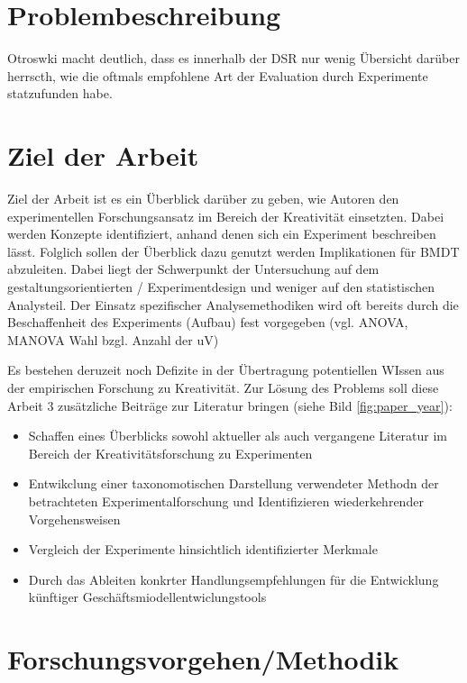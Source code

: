 \section{Problembeschreibung} \label{eqn:1}

Otroswki macht deutlich, dass es innerhalb der DSR nur wenig Übersicht darüber herrscth, wie die oftmals empfohlene Art der Evaluation durch Experimente statzufunden habe.

\section{Ziel der Arbeit}

Ziel der Arbeit ist es ein Überblick darüber zu geben, wie Autoren den experimentellen Forschungsansatz im Bereich der Kreativität einsetzten. Dabei werden Konzepte identifiziert, anhand denen sich ein Experiment beschreiben lässt. Folglich sollen der Überblick dazu genutzt werden Implikationen für BMDT abzuleiten.
Dabei liegt der Schwerpunkt der Untersuchung auf dem gestaltungsorientierten / Experimentdesign und weniger auf den statistischen Analysteil. Der Einsatz spezifischer Analysemethodiken wird oft bereits durch die Beschaffenheit des Experiments (Aufbau) fest vorgegeben (vgl. ANOVA, MANOVA Wahl bzgl. Anzahl der uV)


Es bestehen deruzeit noch Defizite in der Übertragung potentiellen WIssen aus der empirischen Forschung zu Kreativität.
Zur Lösung des Problems soll diese Arbeit 3 zusätzliche Beiträge zur Literatur bringen (siehe Bild \ref{fig:paper_year}):
\begin{itemize}
\item Schaffen eines Überblicks sowohl aktueller als auch vergangene Literatur im Bereich der Kreativitätsforschung zu Experimenten
\item Entwikclung einer taxonomotischen Darstellung verwendeter Methodn  der betrachteten Experimentalforschung und Identifizieren wiederkehrender Vorgehensweisen
\item Vergleich der Experimente hinsichtlich identifizierter Merkmale
\item Durch das Ableiten konkrter Handlungsempfehlungen für die Entwicklung künftiger Geschäftsmiodellentwiclungstools
\end{itemize}





\section{Forschungsvorgehen/Methodik}




